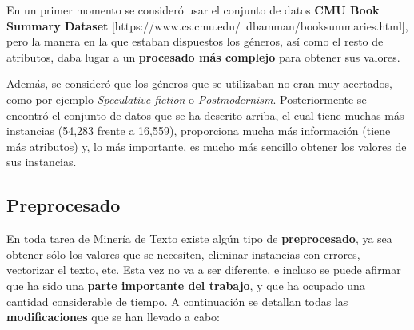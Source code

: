 \documentclass[12pt,a4paper, xcolor=table]{article}
\begin{document}
    \vspace{3mm}

    En un primer momento se consideró usar el conjunto de datos \textbf{CMU Book Summary Dataset} [https://www.cs.cmu.edu/~dbamman/booksummaries.html], pero la manera en la que estaban dispuestos los géneros, así como el resto de atributos, daba lugar a un \textbf{procesado más complejo} para obtener sus valores.

    \vspace{1mm}

    Además, se consideró que los géneros que se utilizaban no eran muy acertados, como por ejemplo \textit{Speculative fiction} o \textit{Postmodernism}. Posteriormente se encontró el conjunto de datos que se ha descrito arriba, el cual tiene muchas más instancias (54,283 frente a 16,559), proporciona mucha más información (tiene más atributos) y, lo más importante, es mucho más sencillo obtener los valores de sus instancias.

    \subsection{Preprocesado}
        En toda tarea de Minería de Texto existe algún tipo de \textbf{preprocesado}, ya sea obtener sólo los valores que se necesiten, eliminar instancias con errores, vectorizar el texto, etc. Esta vez no va a ser diferente, e incluso se puede afirmar que ha sido una \textbf{parte importante del trabajo}, y que ha ocupado una cantidad considerable de tiempo. A continuación se detallan todas las \textbf{modificaciones} que se han llevado a cabo:
\end{document}
